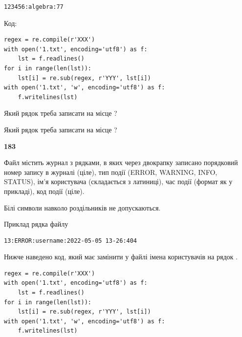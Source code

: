 \begin{verbatim}
123456:algebra:77
\end{verbatim}




Код:



\begin{verbatim}
regex = re.compile(r'XXX')
with open('1.txt', encoding='utf8') as f:
    lst = f.readlines()
for i in range(len(lst)):
    lst[i] = re.sub(regex, r'YYY', lst[i])
with open('1.txt', 'w', encoding='utf8') as f:
    f.writelines(lst)
\end{verbatim}







Який рядок треба записати на місце  ?\par
\vspace{5mm}


Який рядок треба записати на місце  ?\par


\newpage

{\begin {center}\textbf{ 183}\end {center}}\par
Файл  містить журнал з рядками, в яких через двокрапку записано поряд\-ко\-вий номер запису в журналі (ціле), тип події (ERROR, WARNING, INFO, STATUS), ім'я користувача (складається з латиниці), час події (фор\-мат як у прикладі), код події (ціле).

Білі символи навколо роздільників не допускаються.

Приклад рядка файлу



\begin{verbatim}
13:ERROR:username:2022-05-05 13-26:404
\end{verbatim}


Нижче наведено код, який має замінити у файлі імена користувачів на рядок .



\begin{verbatim}
regex = re.compile(r'XXX')
with open('1.txt', encoding='utf8') as f:
    lst = f.readlines()
for i in range(len(lst)):
    lst[i] = re.sub(regex, r'YYY', lst[i])
with open('1.txt', 'w', encoding='utf8') as f:
    f.writelines(lst)
\end{verbatim}







